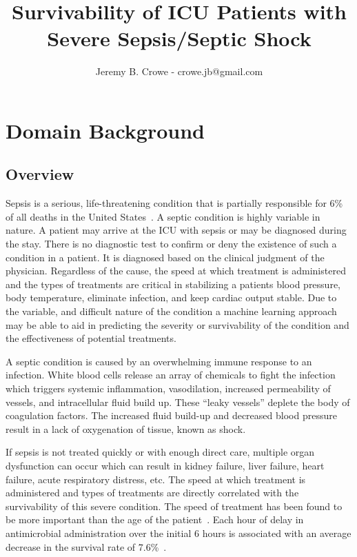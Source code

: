 \documentclass[11pt]{article}
\begin{document}
\title{Survivability of ICU Patients with Severe Sepsis/Septic Shock}
\author{Jeremy B. Crowe - crowe.jb@gmail.com}
\maketitle

\section{Domain Background}
\subsection{Overview}
Sepsis is a serious, life-threatening condition that is partially responsible for 6\%  of all deaths in the United States~\cite{cdc}. A septic condition is highly variable in nature. A patient may arrive at the ICU with sepsis or may be diagnosed during the stay. There is no diagnostic test to confirm or deny the existence of such a condition in a patient. It is diagnosed based on the clinical judgment of the physician. Regardless of the cause, the speed at which treatment is administered and the types of treatments are critical in stabilizing a patients blood pressure, body temperature, eliminate infection, and keep cardiac output stable. Due to the variable, and difficult nature of the condition a machine learning approach may be able to aid in predicting the severity or survivability of the condition and the effectiveness of potential treatments.

A septic condition is caused by an overwhelming immune response to an infection. White blood cells release an array of chemicals to fight the infection which triggers systemic inflammation, vasodilation, increased permeability of vessels, and intracellular fluid build up. These ``leaky vessels'' deplete the body of coagulation factors. The increased fluid build-up and decreased blood pressure result in a lack of oxygenation of tissue, known as shock.

If sepsis is not treated quickly or with enough direct care, multiple organ dysfunction can occur which can result in kidney failure, liver failure, heart failure, acute respiratory distress, etc. The speed at which treatment is administered and types of treatments are directly correlated with the survivability of this severe condition. The speed of treatment has been found to be more important than the age of the patient~\cite{survival2}. Each hour of delay in antimicrobial administration over the initial 6 hours is associated with an average decrease in the survival rate of 7.6\%~\cite{survival}.
\end{document}
